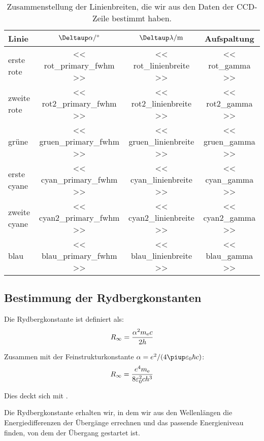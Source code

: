 \begin{landscape}

\begin{table}[htbp]
    \centering
    \begin{tabular}{lSSS}
        Linie & {$\Deltaup\alpha / \si\degree$} & {$\Deltaup\lambda /
    \si\meter$} & {Aufspaltung} \\
        \midrule
        erste rote & << rot_primary_fwhm >> & << rot_linienbreite >> & <<
        rot_gamma >> \\
        zweite rote & << rot2_primary_fwhm >> & << rot2_linienbreite >> & <<
        rot2_gamma >> \\
        grüne & << gruen_primary_fwhm >> & << gruen_linienbreite >> & <<
        gruen_gamma >> \\
        erste cyane & << cyan_primary_fwhm >> & << cyan_linienbreite >> & <<
        cyan_gamma >> \\
        zweite cyane & << cyan2_primary_fwhm >> & << cyan2_linienbreite >> & <<
        cyan2_gamma >> \\
        blau & << blau_primary_fwhm >> & << blau_linienbreite >> & <<
        blau_gamma >> \\
    \end{tabular}
    \caption{%
        Zusammenstellung der Linienbreiten, die wir aus den Daten der CCD-Zeile
        bestimmt haben.
    }
    \label{tab:linienbreiten}
\end{table}

\end{landscape}

\subsection{Bestimmung der Rydbergkonstanten}

Die Rydbergkonstante ist definiert als: \parencite[Umschlag]{meschede-gerthsen_24}
\[
    R_\infty = \frac{\alpha^2 m_\text e c}{2 h}
\]

Zusammen mit der Feinstrukturkonstante $\alpha = e^2/(4\piup \varepsilon_0
\hbar c)$: \parencite[Umschlag]{meschede-gerthsen_24}
\[
    R_\infty = \frac{e^4 m_\text e}{8 \varepsilon_0^2 c h^3}
\]

Dies deckt sich mit \cite{wikipedia/Rydbergkonstante}.

Die Rydbergkonstante erhalten wir, in dem wir aus den Wellenlängen die
Energiedifferenzen der Übergänge errechnen und das passende Energieniveau
finden, von dem der Übergang gestartet ist.

